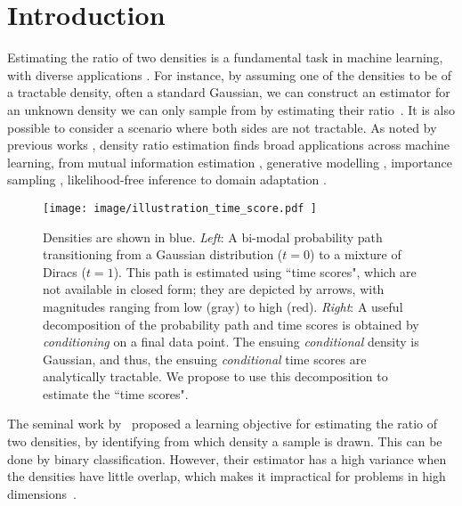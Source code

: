 
\section{Introduction}
\label{sec:introduction}

Estimating the ratio of two densities is a fundamental task in machine learning, with diverse applications \citep{Sugiyama2010}. 
For instance, by assuming one of the densities to be of a tractable density, often a standard Gaussian, we can construct an estimator for an unknown density we can only sample from by estimating their ratio~\citep{gutmann2012nce,gao2019noiseadaptivence,Rhodes2020,choi2022densityratio}. It is also possible to consider a scenario where both sides are not tractable. As noted by previous works \citep{choi2022densityratio}, density ratio estimation finds broad applications across machine learning, from mutual information estimation \citep{song2020vmie}, generative modelling \citep{goodfellow2020generative}, importance sampling \citep{sinha2020neuralbridge}, likelihood-free inference \citep{izbicki2014} to domain adaptation \citep{Wang2023}.

\begin{figure}[ht]
\vskip 0.2in
\begin{center}
\centerline{\texttt{[image: image/illustration\_time\_score.pdf
]}}
\caption{
Densities are shown in blue.
\textit{Left}: A bi-modal probability path transitioning from a Gaussian distribution (\(t = 0\)) to a mixture of Diracs (\(t = 1\)). This path is estimated using ``time scores", which are not available in closed form; they are depicted by arrows, with  magnitudes ranging from low (gray) to high (red).  
\textit{Right}: A useful decomposition of the probability path and time scores is obtained by \textit{conditioning} on a final data point. The ensuing \textit{conditional} density is Gaussian, and thus, the ensuing \textit{conditional} time scores are analytically tractable. We propose to use this decomposition to estimate the ``time scores". 
}
\label{fig:illustration}
\end{center}
\vskip -0.2in
\end{figure}


The seminal work by~\citet{gutmann2012nce} proposed a learning objective for estimating the ratio of two densities, 
by identifying from which density a sample is drawn. This can be done by binary classification. However, their estimator has a high variance when the densities have little overlap, which makes it impractical for problems in high dimensions~\citep{lee2023ncevariance,Chehab2023provable}.

